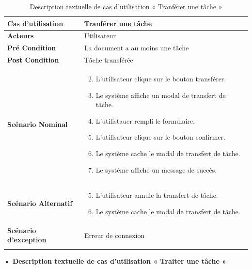 \begin{longtable}{|p{5cm}|p{10cm}|}
\hline
\textbf{Cas d'utilisation}&Tranférer une tâche\\
\hline
\textbf{Acteurs}&Utilisateur\\
\hline
\textbf{Pré Condition}&La document a au moins une tâche\\
\hline
\textbf{Post Condition}&Tâche transférée\\
\hline
\textbf{Scénario Nominal}&
\vspace{-\baselineskip}
\begin{enumerate}
    \setcounter{enumi}{1}
    \item L'utilisateur clique sur le bouton transférer.
    \item Le système affiche un modal de transfert de tâche.
    \item L'utilistauer rempli le formulaire.
    \item L'utilisateur clique sur le bouton confirmer.
    \item Le système cache le modal de transfert de tâche.
    \item Le système affiche un message de succès.
\end{enumerate}\\
\hline
\textbf{Scénario Alternatif}&
\vspace{-\baselineskip}
\begin{enumerate}
    \setcounter{enumi}{4}
    \item L'utilisateur annule la transfert de tâche.
    \item Le système cache le modal de transfert de tâche.
\end{enumerate}\\
\hline
\textbf{Scénario d'exception}&Erreur de connexion\\
\hline
\caption{Description textuelle de cas d'utilisation « Tranférer une tâche »}
\label{tab:DescriptionTextuelleDeCasDUtilisationTranfererUneTache}
\end{longtable}

\textbf{•	Description textuelle de cas d'utilisation « Traiter une tâche »}

